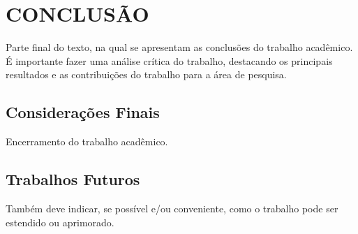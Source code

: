 % 
%


\chapter{CONCLUSÃO}
\label{chap:conclusao}

Parte final do texto, na qual se apresentam as conclusões do trabalho acadêmico. É importante fazer uma análise crítica do trabalho, destacando os principais resultados e as contribuições do trabalho para a área de pesquisa.

\section{Considerações Finais}
\label{sec:consideracoesFinais}

Encerramento do trabalho acadêmico.


\section{Trabalhos Futuros}
\label{sec:trabalhosFuturos}

Também deve indicar, se possível e/ou conveniente, como o trabalho pode ser estendido ou aprimorado.

